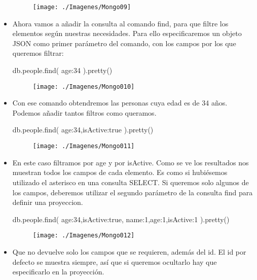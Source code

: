 \begin{itemize}
			\begin{figure}[htb]
				\begin{center}
					\texttt{[image: ./Imagenes/Mongo09]}
				\end{center}
			\end{figure}
			\vspace{10cm}
			\item Ahora vamos a añadir la consulta al comando find, para que filtre los elementos según nuestras necesidades. Para ello especificaremos un objeto JSON como primer parámetro del comando, con los campos por los que queremos filtrar:

db.people.find(
{age:34}
).pretty()

\begin{figure}[htb]
	\begin{center}
		\texttt{[image: ./Imagenes/Mongo010]}
	\end{center}
\end{figure}

\item Con ese comando obtendremos las personas cuya edad es de 34 años. Podemos añadir tantos filtros como queramos.

db.people.find(
{age:34,isActive:true}
).pretty()

\begin{figure}[htb]
	\begin{center}
		\texttt{[image: ./Imagenes/Mongo011]}
	\end{center}
\end{figure}
\vspace{6cm}

\item En este caso filtramos por age y por isActive. Como se ve los resultados nos muestran todos los campos de cada elemento. Es como si hubiésemos utilizado el asterisco en una consulta SELECT. Si queremos solo algunos de los campos, deberemos utilizar el segundo parámetro de la consulta find para definir una proyeccion.

db.people.find(
{age:34,isActive:true},
{name:1,age:1,isActive:1}
).pretty()

\begin{figure}[htb]
	\begin{center}
		\texttt{[image: ./Imagenes/Mongo012]}
	\end{center}
\end{figure}

\item Que no devuelve solo los campos que se requieren, además del id. El id por defecto se muestra siempre, así que si queremos ocultarlo hay que especificarlo en la proyección.


\end{itemize}
